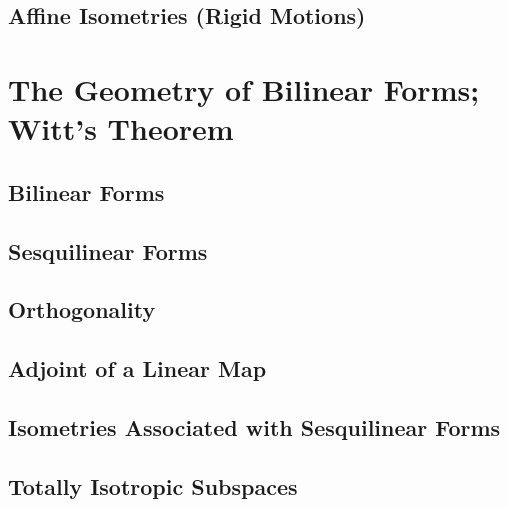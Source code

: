 \documentclass[a4paper]{article}
\begin{document}
\subsection{ Affine Isometries (Rigid Motions)} %


\newpage
\section{The Geometry of Bilinear Forms; Witt’s Theorem}
\subsection{ Bilinear Forms} %

\subsection{ Sesquilinear Forms} %

\subsection{ Orthogonality} %

\subsection{ Adjoint of a Linear Map} %

\subsection{ Isometries Associated with Sesquilinear Forms} %

\subsection{ Totally Isotropic Subspaces} %
\end{document}
